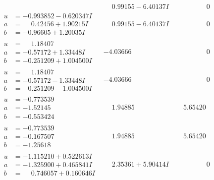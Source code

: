 \documentclass[1p]{elsarticle_modified}
\theoremstyle{definition}
\begin{document}
$$\begin{array}{c|c|c}
 & \phantom{-}0.99155 - 6.40137 I & \phantom{-0.000000 } 0 \\ \hline\begin{aligned}
u &= -0.993852 - 0.620347 I \\
a &= \phantom{-}0.42456 + 1.90215 I \\
b &= -0.96605 + 1.20035 I\end{aligned}
 & \phantom{-}0.99155 - 6.40137 I & \phantom{-0.000000 } 0 \\ \hline\begin{aligned}
u &= \phantom{-}1.18407\phantom{ +0.000000I} \\
a &= -0.57172 + 1.33448 I \\
b &= -0.251209 + 1.004500 I\end{aligned}
 & -4.03666\phantom{ +0.000000I} & \phantom{-0.000000 } 0 \\ \hline\begin{aligned}
u &= \phantom{-}1.18407\phantom{ +0.000000I} \\
a &= -0.57172 - 1.33448 I \\
b &= -0.251209 - 1.004500 I\end{aligned}
 & -4.03666\phantom{ +0.000000I} & \phantom{-0.000000 } 0 \\ \hline\begin{aligned}
u &= -0.773539\phantom{ +0.000000I} \\
a &= -1.52145\phantom{ +0.000000I} \\
b &= -0.553424\phantom{ +0.000000I}\end{aligned}
 & \phantom{-}1.94885\phantom{ +0.000000I} & \phantom{-}5.65420\phantom{ +0.000000I} \\ \hline\begin{aligned}
u &= -0.773539\phantom{ +0.000000I} \\
a &= -0.167507\phantom{ +0.000000I} \\
b &= -1.25618\phantom{ +0.000000I}\end{aligned}
 & \phantom{-}1.94885\phantom{ +0.000000I} & \phantom{-}5.65420\phantom{ +0.000000I} \\ \hline\begin{aligned}
u &= -1.115210 + 0.522613 I \\
a &= -1.325900 + 0.465841 I \\
b &= \phantom{-}0.746057 + 0.160646 I\end{aligned}
 & \phantom{-}2.35361 + 5.90414 I & \phantom{-0.000000 } 0 \\ \hline\begin{aligned}

\end{aligned}
\end{array}$$
\end{document}
